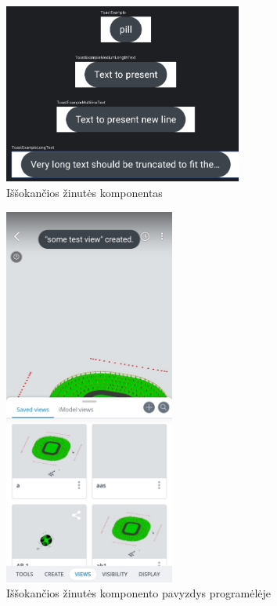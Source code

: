 \documentclass{VUMIFPSPraktika}
\begin{document}
\begin{figure}[htbp!]
    \centering
    \includegraphics[width=0.7\textwidth]{Images/pillAndroid.png}
    \caption{Iššokančios žinutės komponentas}
    \label{fig:pill}
\end{figure}

\begin{figure}[htbp!]
    \centering
    \includegraphics[width=0.5\textwidth]{Images/toastView.jpeg}
    \caption{Iššokančios žinutės komponento pavyzdys programėlėje}
    \label{fig:modelToastView}
\end{figure}
\end{document}
